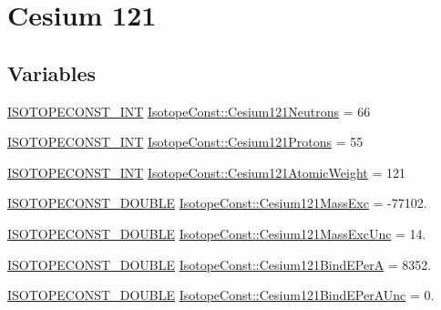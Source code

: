 \hypertarget{group___isotope_const-_cesium-_cs121}{}\section{Cesium 121}
\label{group___isotope_const-_cesium-_cs121}
\subsection*{Variables}
\begin{DoxyCompactItemize}
\item 
\mbox{\hyperlink{group___isotope_const-_macros_ga5f18360b3e99483a35c32d789e62621c}{I\+S\+O\+T\+O\+P\+E\+C\+O\+N\+S\+T\+\_\+\+I\+NT}} \mbox{\hyperlink{group___isotope_const-_cesium-_cs121_ga984da4274ee300ebb7b340c36fc99de2}{Isotope\+Const\+::\+Cesium121\+Neutrons}} = 66
\item 
\mbox{\hyperlink{group___isotope_const-_macros_ga5f18360b3e99483a35c32d789e62621c}{I\+S\+O\+T\+O\+P\+E\+C\+O\+N\+S\+T\+\_\+\+I\+NT}} \mbox{\hyperlink{group___isotope_const-_cesium-_cs121_gadf0a6f873b6fd65d3096f97f015611be}{Isotope\+Const\+::\+Cesium121\+Protons}} = 55
\item 
\mbox{\hyperlink{group___isotope_const-_macros_ga5f18360b3e99483a35c32d789e62621c}{I\+S\+O\+T\+O\+P\+E\+C\+O\+N\+S\+T\+\_\+\+I\+NT}} \mbox{\hyperlink{group___isotope_const-_cesium-_cs121_ga2a15b526e29f1f83b665cb61ff32dacd}{Isotope\+Const\+::\+Cesium121\+Atomic\+Weight}} = 121
\item 
\mbox{\hyperlink{group___isotope_const-_macros_ga8f45a7272ce02c0b4c65c44636ed719a}{I\+S\+O\+T\+O\+P\+E\+C\+O\+N\+S\+T\+\_\+\+D\+O\+U\+B\+LE}} \mbox{\hyperlink{group___isotope_const-_cesium-_cs121_gab49a0d1154b675fb97f2ef593cdf37b1}{Isotope\+Const\+::\+Cesium121\+Mass\+Exc}} = -\/77102.
\item 
\mbox{\hyperlink{group___isotope_const-_macros_ga8f45a7272ce02c0b4c65c44636ed719a}{I\+S\+O\+T\+O\+P\+E\+C\+O\+N\+S\+T\+\_\+\+D\+O\+U\+B\+LE}} \mbox{\hyperlink{group___isotope_const-_cesium-_cs121_ga0b20beb620ede25dec436eceb5921e24}{Isotope\+Const\+::\+Cesium121\+Mass\+Exc\+Unc}} = 14.
\item 
\mbox{\hyperlink{group___isotope_const-_macros_ga8f45a7272ce02c0b4c65c44636ed719a}{I\+S\+O\+T\+O\+P\+E\+C\+O\+N\+S\+T\+\_\+\+D\+O\+U\+B\+LE}} \mbox{\hyperlink{group___isotope_const-_cesium-_cs121_ga389b217a088b13e91342def992ef088f}{Isotope\+Const\+::\+Cesium121\+Bind\+E\+PerA}} = 8352.
\item 
\mbox{\hyperlink{group___isotope_const-_macros_ga8f45a7272ce02c0b4c65c44636ed719a}{I\+S\+O\+T\+O\+P\+E\+C\+O\+N\+S\+T\+\_\+\+D\+O\+U\+B\+LE}} \mbox{\hyperlink{group___isotope_const-_cesium-_cs121_gaafec87dffbba14b3ac98b854fdbf6c70}{Isotope\+Const\+::\+Cesium121\+Bind\+E\+Per\+A\+Unc}} = 0.

\end{DoxyCompactItemize}
